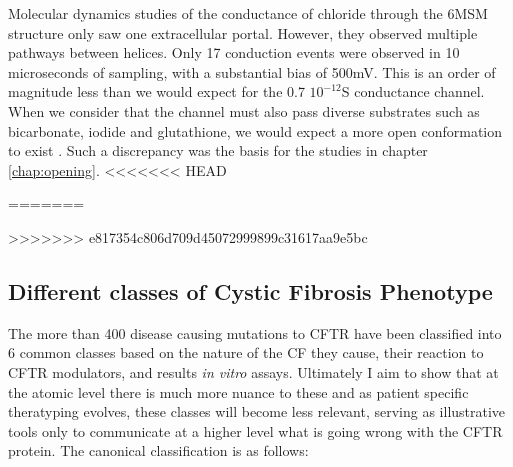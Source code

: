 Molecular dynamics studies of the conductance of chloride through the 6MSM structure only saw one extracellular portal. However, they observed multiple pathways between helices. Only 17 conduction events were observed in 10 microseconds of sampling, with a substantial bias of 500mV. This is an order of magnitude less than we would expect for the 0.7 $10^{-12}$S conductance channel. When we consider that the channel must also pass diverse substrates such as bicarbonate, iodide and glutathione, we would expect a more open conformation to exist \cite{kogan2003,linsdell1998}. Such a discrepancy was the basis for the studies in chapter \ref{chap:opening}.
<<<<<<< HEAD


=======


>>>>>>> e817354c806d709d45072999899c31617aa9e5bc
\subsection{Different classes of Cystic Fibrosis Phenotype}
The more than 400 disease causing mutations to CFTR have been classified into 6 common classes based on the nature of the CF they cause, their reaction to CFTR modulators, and results \textit{in vitro} assays. Ultimately I aim to show that at the atomic level there is much more nuance to these and as patient specific theratyping evolves, these classes will become less relevant, serving as illustrative tools only to communicate at a higher level what is going wrong with the CFTR protein. The canonical classification is as follows:

